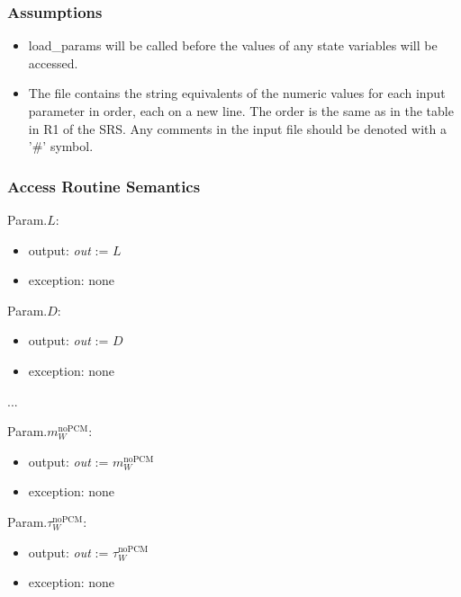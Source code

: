 \documentclass[12pt, titlepage]{article}
\begin{document}
\subsubsection{Assumptions}

\begin{itemize}

\item load\_params will be called before the values of any state variables will be accessed.

\item The file contains the string equivalents of the numeric values for
each input parameter in order, each on a new line. The order is the same as in
the table in R1 of the SRS. Any comments in the input file should be denoted
with a '\#' symbol.

\end{itemize}

\subsubsection{Access Routine Semantics}

\noindent Param.$L$:
\begin{itemize}
\item output: \textit{out} := $L$
\item exception: none
\end{itemize}

\noindent Param.$D$:
\begin{itemize}
\item output: \textit{out} := $D$
\item exception: none
\end{itemize}

...
~\newline

\noindent Param.$m_W^{\text{noPCM}}$:
\begin{itemize}
\item output: \textit{out} := $m_W^{\text{noPCM}}$
\item exception: none
\end{itemize}

\noindent Param.$\tau_W^{\text{noPCM}}$:
\begin{itemize}
\item output: \textit{out} := $\tau_W^{\text{noPCM}}$
\item exception: none
\end{itemize}
\end{document}

